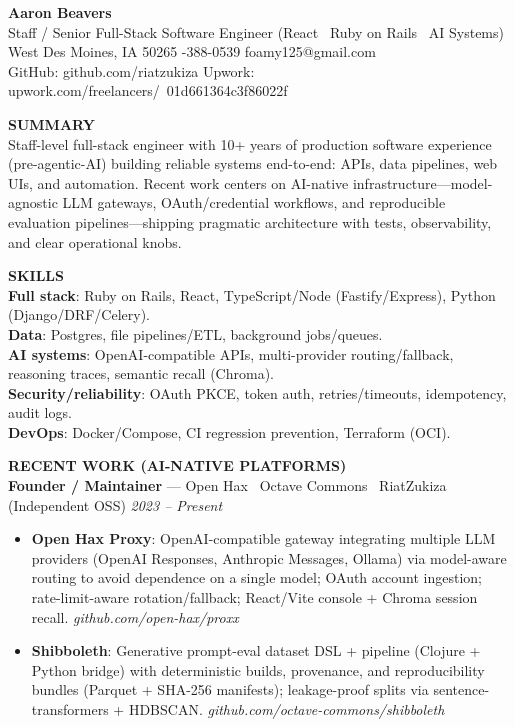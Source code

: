 \documentclass[10pt]{article}
\begin{document}
{\LARGE \textbf{Aaron Beavers}}\\
Staff / Senior Full-Stack Software Engineer (React \textbullet\ Ruby on Rails \textbullet\ AI Systems)\\

West Des Moines, IA 50265 \;\;\textbar\;-388-0539 \;\;\textbar\;\; foamy125@gmail.com\\
GitHub: github.com/riatzukiza \;\;\textbar\;\; Upwork: upwork.com/freelancers/~01d661364c3f86022f

\vspace{6pt}
\textbf{SUMMARY}\\
Staff-level full-stack engineer with 10+ years of production software experience (pre-agentic-AI) building reliable systems end-to-end: APIs, data pipelines, web UIs, and automation. Recent work centers on AI-native infrastructure---model-agnostic LLM gateways, OAuth/credential workflows, and reproducible evaluation pipelines---shipping pragmatic architecture with tests, observability, and clear operational knobs.

\vspace{2pt}
\textbf{SKILLS}\\
\textbf{Full stack}: Ruby on Rails, React, TypeScript/Node (Fastify/Express), Python (Django/DRF/Celery).\\
\textbf{Data}: Postgres, file pipelines/ETL, background jobs/queues.\\
\textbf{AI systems}: OpenAI-compatible APIs, multi-provider routing/fallback, reasoning traces, semantic recall (Chroma).\\
\textbf{Security/reliability}: OAuth PKCE, token auth, retries/timeouts, idempotency, audit logs.\\
\textbf{DevOps}: Docker/Compose, CI regression prevention, Terraform (OCI).

\vspace{6pt}
\textbf{RECENT WORK (AI-NATIVE PLATFORMS)}\\

\textbf{Founder / Maintainer} --- Open Hax \textbullet\ Octave Commons \textbullet\ RiatZukiza (Independent OSS) \hfill \textit{2023 -- Present}\\
\vspace{-6pt}
\begin{itemize}
  \setlength\itemsep{-2pt}
  \setlength\parskip{0pt}
  \setlength\parsep{0pt}
  \item \textbf{Open Hax Proxy}: OpenAI-compatible gateway integrating multiple LLM providers (OpenAI Responses, Anthropic Messages, Ollama) via model-aware routing to avoid dependence on a single model; OAuth account ingestion; rate-limit-aware rotation/fallback; React/Vite console + Chroma session recall. \textit{github.com/open-hax/proxx}
  \item \textbf{Shibboleth}: Generative prompt-eval dataset DSL + pipeline (Clojure + Python bridge) with deterministic builds, provenance, and reproducibility bundles (Parquet + SHA-256 manifests); leakage-proof splits via sentence-transformers + HDBSCAN. \textit{github.com/octave-commons/shibboleth}
\end{itemize}
\end{document}
